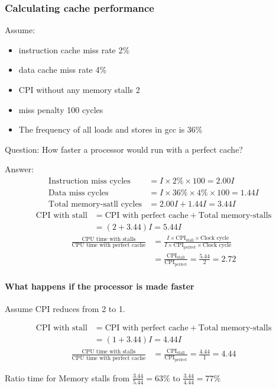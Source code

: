 \subsubsection{Calculating cache performance}
Assume:
\begin{itemize}\small 
    \item instruction cache miss rate 2\%
    \item data cache miss rate 4\%
    \item CPI without any memory stalls 2
    \item miss penalty 100 cycles
    \item The frequency of all loads and stores in gcc is 36\%
\end{itemize}

Question: How faster a processor would run with a perfect cache? 

Answer:{
    \small
    \begin{align*}
        \text{Instruction miss cycles}&=I\times2\%\times100=2.00I\\
        \text{Data miss cycles}&=I\times 36\%\times 4\%\times 100=1.44I\\
        \text{Total memory-satll cycles}&=2.00I+1.44I=3.44I
    \end{align*}
    \begin{align*}
        \text{CPI with stall}&=\text{CPI with perfect cache}+\text{Total memory-stalls}\\
        &=(2+3.44)I=5.44I
    \end{align*}
    \begin{align*}
        \frac{\text{CPU time with stalls}}{\text{CPU time with perfect cache}}&=\frac{I\times \text{CPI}_{\text{stall}}\times \text{Clock cycle}}{I\times \text{CPI}_{\text{perfect}}\times \text{Clock cycle}}\\
        &=\frac{\text{CPI}_{\text{stall}}}{\text{CPI}_{\text{perfect}}}=\frac{5.44}{2}=2.72
    \end{align*}
}
\paragraph{What happens if the processor is made faster}
Assume CPI reduces from 2 to 1. {
    \small
    \begin{align*}
        \text{CPI with stall}&=\text{CPI with perfect cache}+\text{Total memory-stalls}\\
        &=(1+3.44)I=4.44I
    \end{align*}
    \begin{align*}
        \frac{\text{CPU time with stalls}}{\text{CPU time with perfect cache}}
        &=\frac{\text{CPI}_{\text{stall}}}{\text{CPI}_{\text{perfect}}}=\frac{4.44}{1}=4.44
    \end{align*}

    Ratio time for Memory stalls from $\frac{3.44}{5.44}=63\%$ to $\frac{3.44}{4.44}=77\%$
}

